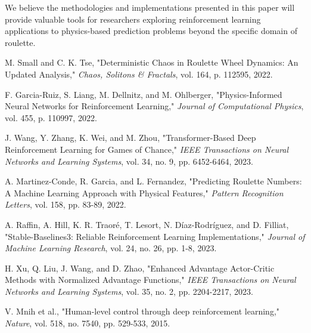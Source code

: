 \documentclass[conference]{IEEEtran}
\begin{document}
We believe the methodologies and implementations presented in this paper will provide valuable tools for researchers exploring reinforcement learning applications to physics-based prediction problems beyond the specific domain of roulette.

\begin{thebibliography}{00}
 M. Small and C. K. Tse, "Deterministic Chaos in Roulette Wheel Dynamics: An Updated Analysis," \textit{Chaos, Solitons \& Fractals}, vol. 164, p. 112595, 2022.

 F. Garcia-Ruiz, S. Liang, M. Dellnitz, and M. Ohlberger, "Physics-Informed Neural Networks for Reinforcement Learning," \textit{Journal of Computational Physics}, vol. 455, p. 110997, 2022.

 J. Wang, Y. Zhang, K. Wei, and M. Zhou, "Transformer-Based Deep Reinforcement Learning for Games of Chance," \textit{IEEE Transactions on Neural Networks and Learning Systems}, vol. 34, no. 9, pp. 6452-6464, 2023.

 A. Martinez-Conde, R. Garcia, and L. Fernandez, "Predicting Roulette Numbers: A Machine Learning Approach with Physical Features," \textit{Pattern Recognition Letters}, vol. 158, pp. 83-89, 2022.

 A. Raffin, A. Hill, K. R. Traoré, T. Lesort, N. Díaz-Rodríguez, and D. Filliat, "Stable-Baselines3: Reliable Reinforcement Learning Implementations," \textit{Journal of Machine Learning Research}, vol. 24, no. 26, pp. 1-8, 2023.

 H. Xu, Q. Liu, J. Wang, and D. Zhao, "Enhanced Advantage Actor-Critic Methods with Normalized Advantage Functions," \textit{IEEE Transactions on Neural Networks and Learning Systems}, vol. 35, no. 2, pp. 2204-2217, 2023.

 V. Mnih et al., "Human-level control through deep reinforcement learning," \textit{Nature}, vol. 518, no. 7540, pp. 529-533, 2015.

\end{thebibliography}
\end{document}
